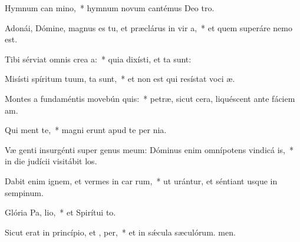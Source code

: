\item Hymnum can mino,~* hymnum novum cantémus Deo tro.
\item Adonái, Dómine, magnus es tu, et præclárus in vir a,~* et quem superáre nemo est.
\item Tibi sérviat omnis crea a:~* quia dixísti, et ta sunt:
\item Misísti spíritum tuum,  ta sunt,~* et non est qui resístat voci æ.
\item Montes a fundaméntis movebún  quis:~* petræ, sicut cera, liquéscent ante fáciem am.
\item Qui  ment te,~* magni erunt apud te per nia.
\item Væ genti insurgénti super genus meum: Dóminus enim omnípotens vindicá  is,~* in die judícii visitábit los.
\item Dabit enim ignem, et vermes in car rum,~* ut urántur, et séntiant usque in sempinum.
\item Glória Pa,  lio,~* et Spirítui to.
\item Sicut erat in princípio, et ,  per,~* et in sǽcula sæculórum. men.

